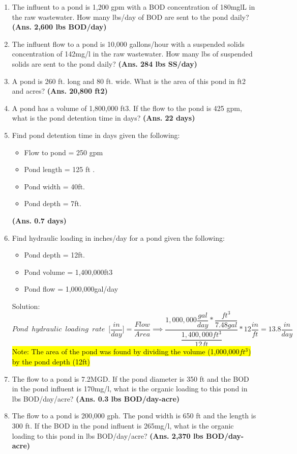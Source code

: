 \begin{enumerate}
\item The influent to a pond is 1,200 gpm with a BOD concentration of 180mglL in the raw wastewater. How many lbs/day of BOD are sent to the pond daily? \textbf{(Ans. 2,600 lbs BOD/day)} 
\item The influent flow to a pond is 10,000 gallons/hour with a suspended solids concentration of 142mg/l in the raw wastewater.  How many lbs of suspended solids are sent to the pond daily? \textbf{(Ans. 284 lbs SS/day)} 
\item A pond is 260 ft. long and 80 ft. wide. What is the area of this pond in ft2 and acres? \textbf{(Ans. 20,800 ft2)} 
\item A pond has a volume of 1,800,000 ft3. If the flow to the pond is 425 gpm, what is the pond detention time in days?
\textbf{(Ans. 22 days)} 

\item Find pond detention time in days given the following:
\begin{itemize}
\item Flow to pond = 250 gpm
\item Pond length = 125 ft .
\item Pond width = 40ft.
\item Pond depth = 7ft.
\end{itemize}
\textbf{(Ans. 0.7 days)} 

\item Find hydraulic loading in inches/day for a pond given the following:

\begin{itemize}
\item Pond depth = 12ft.
\item Pond volume = 1,400,000ft3
\item Pond flow = 1,000,000gal/day
\end{itemize}
Solution:\\
$Pond \enspace hydraulic \enspace loading \enspace rate \enspace \Bigg[\dfrac{in}{day}\Bigg]=\dfrac{Flow}{Area} \implies\dfrac{1,000,000\dfrac{gal}{day}*\dfrac{ft^3 }{7.48gal}}{\dfrac{1,400,000ft^3}{12ft}}*12\dfrac{in}{ft}=\boxed{13.8\dfrac{in}{day}}$\\
\vspace{0.3cm}
\hl{Note:  The area of the pond was found by dividing the volume (1,000,000$ft^3$) by the pond depth (12ft)}


\item The flow to a pond is 7.2MGD. If the pond diameter is 350 ft and the BOD in the pond influent is 170mg/l, what is the organic loading to this pond in lbs BOD/day/acre? \textbf{(Ans. 0.3 lbs BOD/day-acre)} 
\item The flow to a pond is 200,000 gph. The pond width is 650 ft and the length is 300 ft. If the BOD in the pond influent is 265mg/l, what is the organic loading to this pond in lbs BOD/day/acre? \textbf{(Ans. 2,370 lbs BOD/day-acre)}


\end{enumerate}

